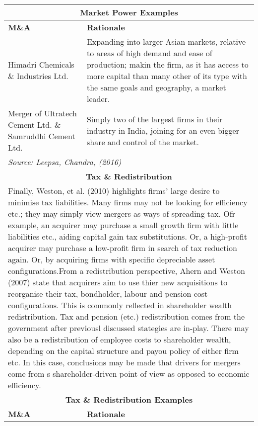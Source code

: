 \documentclass[11pt, english]{article}
\begin{document}
\begin{center}
\begin{longtable}{p{5cm}p{7.5cm}}
        \hline
        \multicolumn{2}{c}{\textbf{Market Power Examples}}\\
	\hline
        \textbf{M\&A} & \textbf{Rationale}\\ 
        \hline
        Himadri Chemicals \& Industries Ltd. & Expanding into larger Asian markets, relative to areas of high demand and ease of production; makin the firm, as it has access to more capital than many other of its type with the same goals and geography, a market leader.\\
        Merger of Ultratech Cement Ltd. \& Samruddhi Cement Ltd. & Simply two of the largest firms in their industry in India, joining for an even bigger share and control of the market.\\
        \hline
        \multicolumn{2}{p{13cm}}{\textit{Source: Leepsa, Chandra, (2016)}}\\
        \hline
        \hline
        \multicolumn{2}{c}{\textbf{Tax \& Redistribution}}\\        
        \hline
        \hline
        \multicolumn{2}{p{13cm}}{Finally, Weston, et al. (2010) highlights firms' large desire to minimise tax liabilities. Many firms may not be looking for efficiency etc.; they may simply view mergers as ways of spreading tax. Ofr example, an acquirer may purchase a small growth firm with little liabilities etc., aiding capital gain tax substitutions. Or, a high-profit acquirer may purchase a low-profit firm in search of tax reduction again. Or, by acquiring firms with specific depreciable asset configurations.\newline\newline From a redistribution perspective, Ahern and Weston (2007) state that acquirers aim to use thier new acquisitions to reorganise their tax, bondholder, labour and pension cost configurations. This is commonly reflected in shareholder wealth redistribution. Tax and pension (etc.) redistribution comes from the government after previousl discussed stategies are in-play. There may also be a redistribution of employee costs to shareholder wealth, depending on the capital structure and payou policy of either firm etc. In this case, conclusions may be made that drivers for mergers come from s shareholder-driven point of view as opposed to economic efficiency.}\\
        \hline
        \multicolumn{2}{c}{\textbf{Tax \& Redistribution Examples}}\\
        \hline
        \textbf{M\&A} & \textbf{Rationale}\\ 

\end{longtable}
\end{center}
\end{document}
